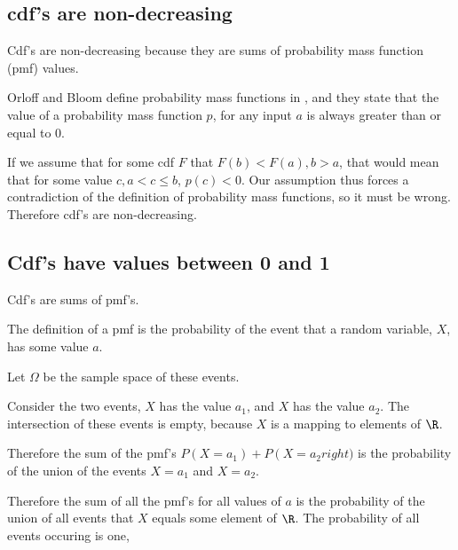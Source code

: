 \documentclass[a4paper,11pt]{article}
\begin{document}
\subsection{cdf's are non-decreasing}

Cdf's are non-decreasing because they are sums of probability mass
function (pmf) values.

Orloff and Bloom define probability mass functions in \cite{reading4}, 
and they state that the value of a probability mass function $p$,
for any input $a$ is always greater than or equal to 0.

If we assume that for some cdf $F$ that $F \left( b \right) <
F \left(a \right), b > a$, that would mean that for some value
$c, a < c \leq b$, $p\left( c \right) < 0$.  Our assumption thus
forces a contradiction of the definition of probability mass functions,
so it must be wrong.  Therefore cdf's are non-decreasing.

\subsection{Cdf's have values between 0 and 1}

Cdf's are sums of pmf's.

The definition of a pmf is the probability of the event
that a random variable, $X$, has some value $a$.

Let $\Omega$ be the sample space of these events.

Consider the two events, $X$ has the value $a_{1}$, 
and $X$ has the value $a_{2}$.  The intersection
of these events is empty, because $X$ is a mapping
to elements of $\R$.

Therefore the sum of the pmf's $P \left( X=a_{1} \right) +
P \left( X=a_{2} right)$ is the probability of the union
of the events $X=a_{1}$ and $X=a_{2}$.

Therefore the sum of all the pmf's for all values of
$a$ is the probability of the union of all events 
that $X$ equals some element of $\R$. The probability
of all events occuring is one, 

\printbibliography{}
\end{document}
